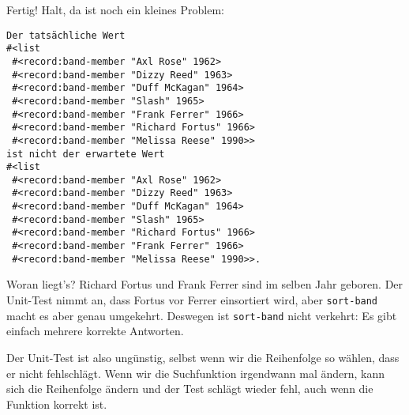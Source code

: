 %
Fertig! Halt, da ist noch ein kleines Problem:
%
\begin{verbatim}
Der tatsächliche Wert 
#<list
 #<record:band-member "Axl Rose" 1962>
 #<record:band-member "Dizzy Reed" 1963>
 #<record:band-member "Duff McKagan" 1964>
 #<record:band-member "Slash" 1965>
 #<record:band-member "Frank Ferrer" 1966>
 #<record:band-member "Richard Fortus" 1966>
 #<record:band-member "Melissa Reese" 1990>>
ist nicht der erwartete Wert 
#<list
 #<record:band-member "Axl Rose" 1962>
 #<record:band-member "Dizzy Reed" 1963>
 #<record:band-member "Duff McKagan" 1964>
 #<record:band-member "Slash" 1965>
 #<record:band-member "Richard Fortus" 1966>
 #<record:band-member "Frank Ferrer" 1966>
 #<record:band-member "Melissa Reese" 1990>>.
\end{verbatim}
%
Woran liegt's?  Richard Fortus und Frank Ferrer sind im selben Jahr
geboren.  Der Unit-Test nimmt an, dass Fortus vor Ferrer
einsortiert wird, aber \lstinline{sort-band} macht es aber genau
umgekehrt.  Deswegen ist \lstinline{sort-band} nicht verkehrt: Es gibt
einfach mehrere korrekte Antworten.

Der Unit-Test ist also ungünstig, selbst wenn wir die Reihenfolge so
wählen, dass er nicht fehlschlägt.  Wenn wir die Suchfunktion
irgendwann mal ändern, kann
sich die Reihenfolge ändern und der Test schlägt wieder fehl, auch
wenn die Funktion korrekt ist.

